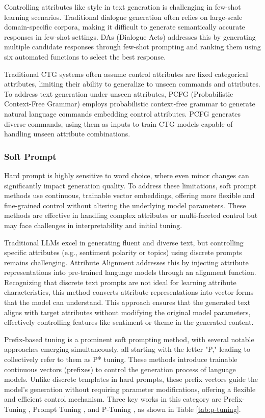 \documentclass[acmsmall, screen]{acmart}
\begin{document}
Controlling attributes like style in text generation is challenging in few-shot learning scenarios. Traditional dialogue generation often relies on large-scale domain-specific corpora, making it difficult to generate semantically accurate responses in few-shot settings. DAs (Dialogue Acts) \cite{ramirez_sigdial23_DAs} addresses this by generating multiple candidate responses through few-shot prompting and ranking them using six automated functions to select the best response.

Traditional CTG systems often assume control attributes are fixed categorical attributes, limiting their ability to generalize to unseen commands and attributes. To address text generation under unseen attributes, PCFG (Probabilistic Context-Free Grammar) \cite{zhang_SEM23_PCFG} employs probabilistic context-free grammar to generate natural language commands embedding control attributes. PCFG generates diverse commands, using them as inputs to train CTG models capable of handling unseen attribute combinations.

\subsubsection{\textbf{Soft Prompt}} 
Hard prompt is highly sensitive to word choice, where even minor changes can significantly impact generation quality. To address these limitations, soft prompt methods use continuous, trainable vector embeddings, offering more flexible and fine-grained control without altering the underlying model parameters. These methods are effective in handling complex attributes or multi-faceted control but may face challenges in interpretability and initial tuning.

Traditional LLMs excel in generating fluent and diverse text, but controlling specific attributes (e.g., sentiment polarity or topics) using discrete prompts remains challenging. Attribute Alignment \cite{yu_emnlp21_AttributeAlignment} addresses this by injecting attribute representations into pre-trained language models through an alignment function. Recognizing that discrete text prompts are not ideal for learning attribute characteristics, this method converts attribute representations into vector forms that the model can understand. This approach ensures that the generated text aligns with target attributes without modifying the original model parameters, effectively controlling features like sentiment or theme in the generated content.

Prefix-based tuning is a prominent soft prompting method, with several notable approaches emerging simultaneously, all starting with the letter "P," leading \cite{li_acl21_PrefixTuning} to collectively refer to them as P* tuning. These methods introduce trainable continuous vectors (prefixes) to control the generation process of language models. Unlike discrete templates in hard prompts, these prefix vectors guide the model's generation without requiring parameter modifications, offering a flexible and efficient control mechanism. Three key works in this category are Prefix-Tuning \cite{li_acl21_PrefixTuning}, Prompt Tuning \cite{lester_emnlp21_PromptTuning}, and P-Tuning \cite{liu_arxiv21_PTuning}, as shown in Table \ref{tab:p-tuning}.
\end{document}
